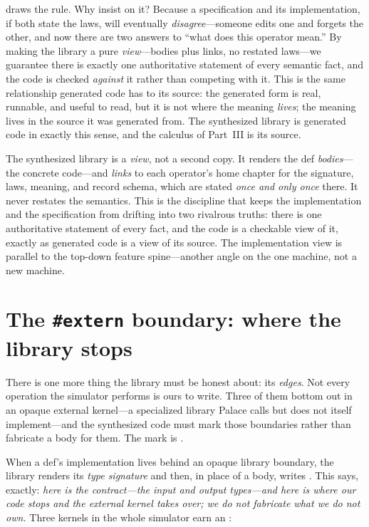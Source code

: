  draws the rule. Why insist on it? Because a specification and
its implementation, if both state the laws, will eventually \emph{disagree}---someone
edits one and forgets the other, and now there are two answers to ``what does this
operator mean.'' By making the library a pure \emph{view}---bodies plus links, no
restated laws---we guarantee there is exactly one authoritative statement of every
semantic fact, and the code is checked \emph{against} it rather than competing with
it. This is the same relationship generated code has to its source: the generated
form is real, runnable, and useful to read, but it is not where the meaning
\emph{lives}; the meaning lives in the source it was generated from. The synthesized
library is generated code in exactly this sense, and the calculus of Part~III is its
source.

\begin{keyidea}
The synthesized library is a \emph{view}, not a second copy. It renders the def
\emph{bodies}---the concrete code---and \emph{links} to each operator's home chapter
for the signature, laws, meaning, and record schema, which are stated \emph{once and
only once} there. It never restates the semantics. This is the discipline that keeps
the implementation and the specification from drifting into two rivalrous truths:
there is one authoritative statement of every fact, and the code is a checkable view
of it, exactly as generated code is a view of its source. The implementation view is
parallel to the top-down feature spine---another angle on the one machine, not a new
machine.
\end{keyidea}

\section{The \texttt{\#extern} boundary: where the library stops}
\label{sec:extern}

There is one more thing the library must be honest about: its \emph{edges}. Not
every operation the simulator performs is ours to write. Three of them bottom out in
an opaque external kernel---a specialized library Palace calls but does not
itself implement---and the synthesized code must mark those boundaries rather than
fabricate a body for them. The mark is .

When a def's implementation lives behind an opaque library boundary, the library
renders its \emph{type signature} and then, in place of a body, writes
. This says, exactly: \emph{here is the contract---the input and
output types---and here is where our code stops and the external kernel takes over;
we do not fabricate what we do not own.} Three kernels in the whole simulator earn
an :

